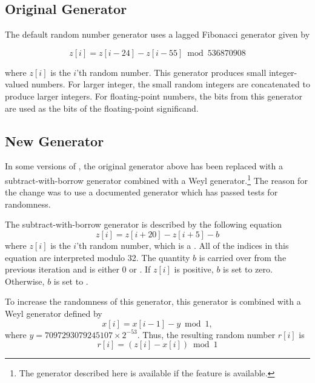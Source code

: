 \subsection{Original Generator}

The default random number generator uses a lagged Fibonacci generator
given by

\begin{displaymath}
  z[i] = z[i - 24] - z[i - 55] \bmod 536870908
\end{displaymath}

where $z[i]$ is the $i$'th random number.  This generator produces
small integer-valued numbers.  For larger integer, the small random
integers are concatenated to produce larger integers.  For
floating-point numbers, the bits from this generator are used as the
bits of the floating-point significand.

\subsection{New Generator}

In some versions of \cmucl{}, the original generator above has been
replaced with a subtract-with-borrow generator
combined with a Weyl generator.\footnote{The generator described here
  is available if the feature  is available.}  The
reason for the change was to use a documented generator which has
passed tests for randomness. 

The subtract-with-borrow generator is described by the following
equation
\begin{displaymath}
  z[i] = z[i + 20] - z[i + 5] - b
\end{displaymath}
where $z[i]$ is the $i$'th random number, which is a
.  All of the indices in this equation are
interpreted modulo 32.  The quantity $b$ is carried over from the
previous iteration and is either 0 or .  If
$z[i]$ is positive, $b$ is set to zero.  Otherwise, $b$ is set to
.

To increase the randomness of this generator, this generator is
combined with a Weyl generator defined by
\begin{displaymath}
  x[i] = x[i - 1] - y \bmod 1,
\end{displaymath}
where $y = 7097293079245107 \times 2^{-53}$.  Thus, the resulting
random number $r[i]$ is
\begin{displaymath}
  r[i] = (z[i] - x[i]) \bmod 1
\end{displaymath}

